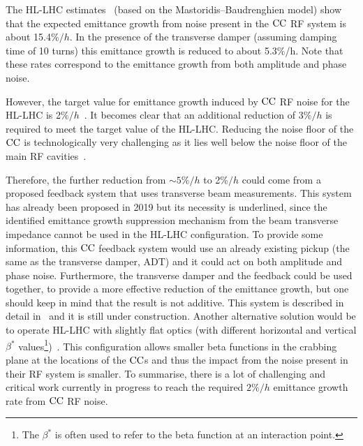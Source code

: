 The HL-LHC estimates~\cite{cc_noise_hl_lhc_estimates} (based on the Mastoridis--Baudrenghien model) show that the expected emittance growth from noise present in the ${\mathrm{CC}}$ RF system is about 15.4$\%/h$. In the presence of the transverse damper (assuming damping time of 10 turns) this emittance growth is reduced to about 5.3$\%$/h. Note that these rates correspond to the emittance growth from both amplitude and phase noise. 


However, the target value for emittance growth induced by ${\mathrm{CC}}$ RF noise for the HL-LHC is 2$\%/h$~\cite{MedinaMedrano:2301928, CC_lumi_limits_philippe, CC_lumi_limits_ilias}. It becomes clear that an additional reduction of 3$\%/h$ is required to meet the target value of the HL-LHC. Reducing the noise floor of the ${\mathrm{CC}}$ is technologically very challenging as it lies well below the noise floor of the main RF cavities~\cite{cc_noise_hl_lhc_estimates}. %


Therefore, the further reduction from $\sim 5\%/h$ to 2$\%/h$ could come from a proposed feedback system that uses transverse beam measurements. This system has already been proposed in 2019 but its necessity is underlined, since the identified emittance growth suppression mechanism from the beam transverse impedance cannot be used in the HL-LHC configuration. To provide some information, this ${\mathrm{CC}}$ feedback system would use an already existing pickup (the same as the transverse damper, ADT) and it could act on both amplitude and phase noise.  Furthermore, the transverse damper and the feedback could be used together, to provide a more effective reduction of the emittance growth, but one should keep in mind that the result is not additive. This system is described in detail in~\cite{Baudrenghien:2665950} and it is still under construction. %
Another alternative solution would be to operate HL-LHC with slightly flat optics (with different horizontal and vertical $\beta^{\ast}$ values\footnote{The $\beta^{\ast}$ is often used to refer to the beta function at an interaction point.})~\cite{elias_run4_op}. %
This configuration allows smaller beta functions in the crabbing plane at the locations of the ${\mathrm{CC}}$s and thus the impact from the noise present in their RF system is smaller. To summarise, there is a lot of challenging and critical work currently in progress to reach the required $2\%/h$ emittance growth rate from ${\mathrm{CC}}$ RF noise.



